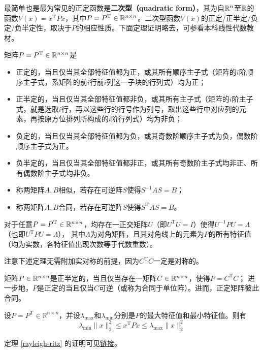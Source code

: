 最简单也是最为常见的正定函数是{\bf 二次型（quadratic form）}，其为自$\mathbb{R}{}^n$至$\mathbb{R}{}$的函数$V(x)=x^\mathrm{T}Px$，其中$P=P^\mathrm{T}\in\mathbb{R}{}^{n\times n}$。二次型函数$V(x)$的正定/正半定/负定/负半定性，取决于$P$的相应性质。下面定理证明略去，可参看本科线性代数教材。
\begin{theorem}\label{pd_nd_thm}
  矩阵$P=P^\mathrm{T}\in\mathbb{R}{}^{n\times n}$是\begin{itemize}[leftmargin=1em]
    \item 正定的，当且仅当其全部特征值都为正，或其所有顺序主子式（矩阵的$i$阶顺序主子式，系矩阵的前$i$行前$i$列这一子块的行列式）均为正；
    \item 正半定的，当且仅当其全部特征值都非负，或其所有主子式（矩阵的$i$阶主子式，就是选取$i$行，再以这些行的行号作为列号，取出这些行中对应列的元素，再按原方位排列所构成的$i$阶行列式）均为非负；
    \item 负定的，当且仅当其全部特征值都为负，或其奇数阶顺序主子式为负，偶数阶顺序主子式为正。
    \item 负半定的，当且仅当其全部特征值都非正，或其所有奇数阶主子式均非正、所有偶数阶主子式均非负。
  \end{itemize}
\end{theorem}
\begin{definition}[相似与合同]
  \begin{itemize}[leftmargin=1em]
    \item 称两矩阵$A,B$相似，若存在可逆阵$S$使得$S^{-1}AS=B$；
    \item 称两矩阵$A,B$合同，若存在可逆阵$S$使得$S^{\mathrm{T}}AS=B$。
  \end{itemize}
\end{definition}
\begin{theorem}[实对称矩阵的正交相似对角化]\label{ortho_sim_diag}
  对于任意$P=P^\mathrm{T}\in\mathbb{R}{}^{n\times n}$，均存在一正交矩阵$U$（即$U^\mathrm{T}U=I$）使得$U^{-1}PU=\Lambda$（也即$U^{\mathrm{T}}PU=\Lambda$），
  其中$\Lambda$为对角矩阵，且其对角线上的元素为$P$的所有特征值（均为实数，各特征值出现次数等于代数重数）。
\end{theorem}
注意下述定理无需附加实对称的前提，因为$C^\mathrm{T}C$一定是对称的。
\begin{theorem}[正定、正半定矩阵的分解]\label{pd_npd_div}
  矩阵$P\in\mathbb{R}{}^{n\times n}$是正半定的，当且仅当存在一矩阵$C\in\mathbb{R}{}^{n\times n}$，使得$P=C^\mathrm{T}C$；
  进一步地，$P$是正定的当且仅当$C$可逆（或称为合同于单位阵）。进而，正定矩阵彼此合同。
\end{theorem}
\begin{theorem}\label{rayleigh-ritz}
  设$P=P^{\mathrm{T}}\in\mathbb{R}^{n\times n}$，并设$\lambda_\mathrm{max}$和$\lambda_\mathrm{min}$分别是$P$的最大特征值和最小特征值。则有
\[\lambda_{\mathrm{min}}\|x\|_{2}^{2}\le x^{\mathrm{T}}Px\le \lambda_{\mathrm{max}}\|x\|_{2}^{2}\]
\end{theorem}
定理 \ref{rayleigh-ritz} 的证明可见\href{https://oliverwu.top/file/rayleigh-ritz.pdf}{链接}。